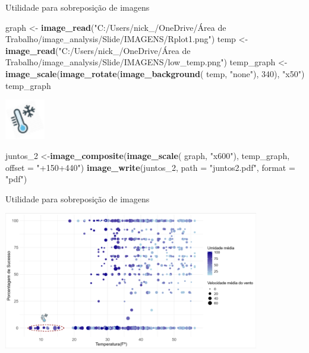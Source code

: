 \documentclass[
  ignorenonframetext,
]{beamer}
\newenvironment{Shaded}{\begin{snugshade}}{\end{snugshade}}
\newcommand{\DataTypeTok}[1]{\textcolor[rgb]{0.13,0.29,0.53}{#1}}
\newcommand{\DecValTok}[1]{\textcolor[rgb]{0.00,0.00,0.81}{#1}}
\newcommand{\KeywordTok}[1]{\textcolor[rgb]{0.13,0.29,0.53}{\textbf{#1}}}
\newcommand{\NormalTok}[1]{#1}
\newcommand{\StringTok}[1]{\textcolor[rgb]{0.31,0.60,0.02}{#1}}
\begin{document}
\begin{frame}[fragile]{Utilidade para sobreposição de imagens}
\protect\hypertarget{utilidade-para-sobreposiuxe7uxe3o-de-imagens}{}

\begin{Shaded}
\begin{Highlighting}[]
\NormalTok{graph <-}\StringTok{ }\KeywordTok{image_read}\NormalTok{(}\StringTok{"C:/Users/nick_/OneDrive/Área de Trabalho/image_analysis/Slide/IMAGENS/Rplot1.png"}\NormalTok{)}
\NormalTok{temp <-}\StringTok{ }\KeywordTok{image_read}\NormalTok{(}\StringTok{"C:/Users/nick_/OneDrive/Área de Trabalho/image_analysis/Slide/IMAGENS/low_temp.png"}\NormalTok{)}
\NormalTok{temp_graph <-}\StringTok{ }\KeywordTok{image_scale}\NormalTok{(}\KeywordTok{image_rotate}\NormalTok{(}\KeywordTok{image_background}\NormalTok{(}
\NormalTok{  temp, }\StringTok{"none"}\NormalTok{), }\DecValTok{340}\NormalTok{), }\StringTok{"x50"}\NormalTok{)}
\NormalTok{temp_graph}
\end{Highlighting}
\end{Shaded}

\includegraphics[width=0.69in]{SLIDES_files/figure-beamer/6-1}

\begin{Shaded}
\begin{Highlighting}[]
\NormalTok{juntos_}\DecValTok{2}\NormalTok{ <-}\KeywordTok{image_composite}\NormalTok{(}\KeywordTok{image_scale}\NormalTok{(}
\NormalTok{  graph, }\StringTok{"x600"}\NormalTok{), temp_graph, }\DataTypeTok{offset =} \StringTok{"+150+440"}\NormalTok{)}
\KeywordTok{image_write}\NormalTok{(juntos_}\DecValTok{2}\NormalTok{, }\DataTypeTok{path =} \StringTok{"juntos2.pdf"}\NormalTok{, }\DataTypeTok{format =} \StringTok{"pdf"}\NormalTok{)}
\end{Highlighting}
\end{Shaded}

\end{frame}

\begin{frame}{Utilidade para sobreposição de imagens}
\protect\hypertarget{utilidade-para-sobreposiuxe7uxe3o-de-imagens-1}{}

\includegraphics[width=4.4in]{juntos2}

\begin{center}
\tiny{}
\end{center}

\end{frame}
\end{document}
